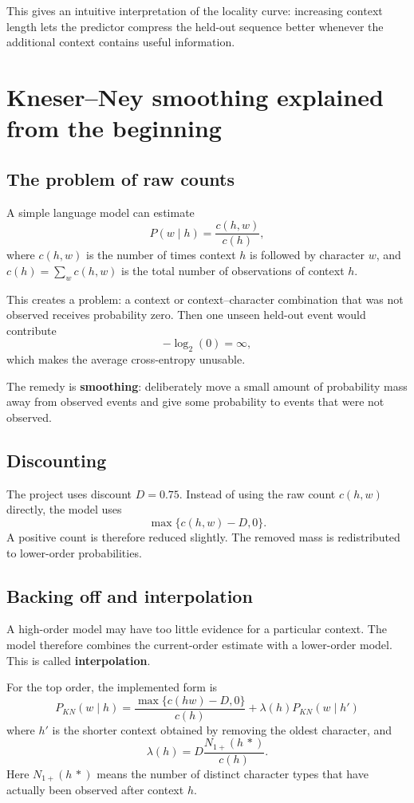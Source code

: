 \documentclass[11pt]{article}
\begin{document}
This gives an intuitive interpretation of the locality curve: increasing context length lets the predictor compress the held-out sequence better whenever the additional context contains useful information.

\newpage
\section{Kneser--Ney smoothing explained from the beginning}

\subsection{The problem of raw counts}
A simple language model can estimate
\[
P(w\mid h)=\frac{c(h,w)}{c(h)},
\]
where $c(h,w)$ is the number of times context $h$ is followed by character $w$, and $c(h)=\sum_wc(h,w)$ is the total number of observations of context $h$.

This creates a problem: a context or context--character combination that was not observed receives probability zero. Then one unseen held-out event would contribute
\[
-\log_2(0)=\infty,
\]
which makes the average cross-entropy unusable.

The remedy is \textbf{smoothing}: deliberately move a small amount of probability mass away from observed events and give some probability to events that were not observed.

\subsection{Discounting}
The project uses discount $D=0.75$. Instead of using the raw count $c(h,w)$ directly, the model uses
\[
\max\{c(h,w)-D,0\}.
\]
A positive count is therefore reduced slightly. The removed mass is redistributed to lower-order probabilities.

\subsection{Backing off and interpolation}
A high-order model may have too little evidence for a particular context. The model therefore combines the current-order estimate with a lower-order model. This is called \textbf{interpolation}.

For the top order, the implemented form is
\[
\boxed{
P_{KN}(w\mid h)=
\frac{\max\{c(hw)-D,0\}}{c(h)}
+\lambda(h)P_{KN}(w\mid h')
}
\]
where $h'$ is the shorter context obtained by removing the oldest character, and
\[
\lambda(h)=D\frac{N_{1+}(h\,*)}{c(h)}.
\]
Here $N_{1+}(h\,*)$ means the number of distinct character types that have actually been observed after context $h$.
\end{document}
